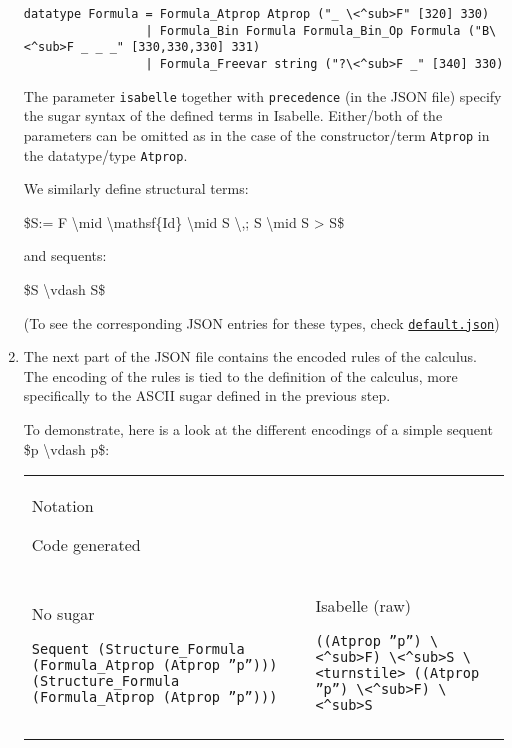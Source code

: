 \begin{enumerate}
\begin{verbatim}
datatype Formula = Formula_Atprop Atprop ("_ \<^sub>F" [320] 330)
                 | Formula_Bin Formula Formula_Bin_Op Formula ("B\<^sub>F _ _ _" [330,330,330] 331)
                 | Formula_Freevar string ("?\<^sub>F _" [340] 330)
\end{verbatim}

  The parameter \texttt{isabelle} together with \texttt{precedence} (in
  the JSON file) specify the sugar syntax of the defined terms in
  Isabelle. Either/both of the parameters can be omitted as in the case
  of the constructor/term \texttt{Atprop} in the datatype/type
  \texttt{Atprop}.

  We similarly define structural terms:

  \$S:= F \textbackslash{}mid \textbackslash{}mathsf\{Id\}
  \textbackslash{}mid S \textbackslash{},; S \textbackslash{}mid S
  \textgreater{} S\$

  and sequents:

  \$S \textbackslash{}vdash S\$

  (To see the corresponding JSON entries for these types, check
  \href{https://github.com/goodlyrottenapple/calculus-toolbox/blob/master/default.json}{\texttt{default.json}})
\item
  The next part of the JSON file contains the encoded rules of the
  calculus. The encoding of the rules is tied to the definition of the
  calculus, more specifically to the ASCII sugar defined in the previous
  step.

  To demonstrate, here is a look at the different encodings of a simple
  sequent \$p \textbackslash{}vdash p\$:

  \begin{longtable}[c]{@{}ll@{}}
  \toprule\addlinespace
  \begin{minipage}[b]{0.47\columnwidth}\raggedright
  Notation

  Code generated
  \end{minipage}
  \\\addlinespace
  \midrule\endhead
  \begin{minipage}[t]{0.47\columnwidth}\raggedright
  No sugar

  \texttt{Sequent (Structure\_Formula (Formula\_Atprop (Atprop ''p''))) (Structure\_Formula (Formula\_Atprop (Atprop ''p'')))}
  \end{minipage} & \begin{minipage}[t]{0.47\columnwidth}\raggedright
  Isabelle (raw)

  \texttt{((Atprop ''p'') \textbackslash{}\textless{}\^{}sub\textgreater{}F) \textbackslash{}\textless{}\^{}sub\textgreater{}S \textbackslash{}\textless{}turnstile\textgreater{} ((Atprop ''p'') \textbackslash{}\textless{}\^{}sub\textgreater{}F) \textbackslash{}\textless{}\^{}sub\textgreater{}S}
  \end{minipage}
  \\\addlinespace
  \bottomrule
  \end{longtable}


\end{enumerate}
